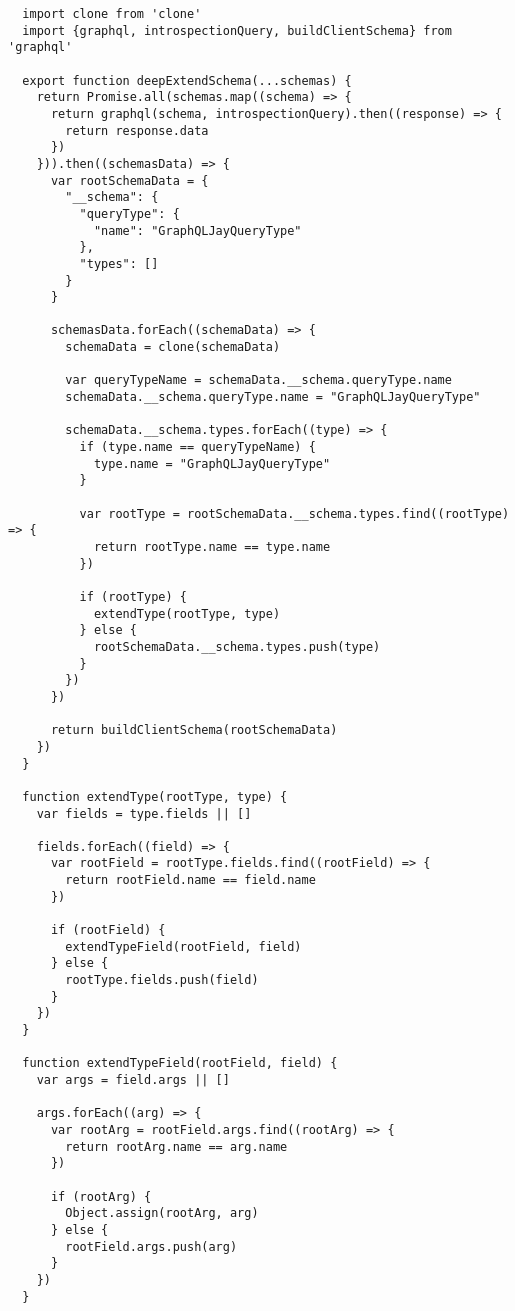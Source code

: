 \begin{verbatim}
  import clone from 'clone'
  import {graphql, introspectionQuery, buildClientSchema} from 'graphql'

  export function deepExtendSchema(...schemas) {
    return Promise.all(schemas.map((schema) => {
      return graphql(schema, introspectionQuery).then((response) => {
        return response.data
      })
    })).then((schemasData) => {
      var rootSchemaData = {
        "__schema": {
          "queryType": {
            "name": "GraphQLJayQueryType"
          },
          "types": []
        }
      }

      schemasData.forEach((schemaData) => {
        schemaData = clone(schemaData)

        var queryTypeName = schemaData.__schema.queryType.name
        schemaData.__schema.queryType.name = "GraphQLJayQueryType"

        schemaData.__schema.types.forEach((type) => {
          if (type.name == queryTypeName) {
            type.name = "GraphQLJayQueryType"
          }

          var rootType = rootSchemaData.__schema.types.find((rootType) => {
            return rootType.name == type.name
          })

          if (rootType) {
            extendType(rootType, type)
          } else {
            rootSchemaData.__schema.types.push(type)
          }
        })
      })

      return buildClientSchema(rootSchemaData)
    })
  }

  function extendType(rootType, type) {
    var fields = type.fields || []

    fields.forEach((field) => {
      var rootField = rootType.fields.find((rootField) => {
        return rootField.name == field.name
      })

      if (rootField) {
        extendTypeField(rootField, field)
      } else {
        rootType.fields.push(field)
      }
    })
  }

  function extendTypeField(rootField, field) {
    var args = field.args || []

    args.forEach((arg) => {
      var rootArg = rootField.args.find((rootArg) => {
        return rootArg.name == arg.name
      })

      if (rootArg) {
        Object.assign(rootArg, arg)
      } else {
        rootField.args.push(arg)
      }
    })
  }
\end{verbatim}
